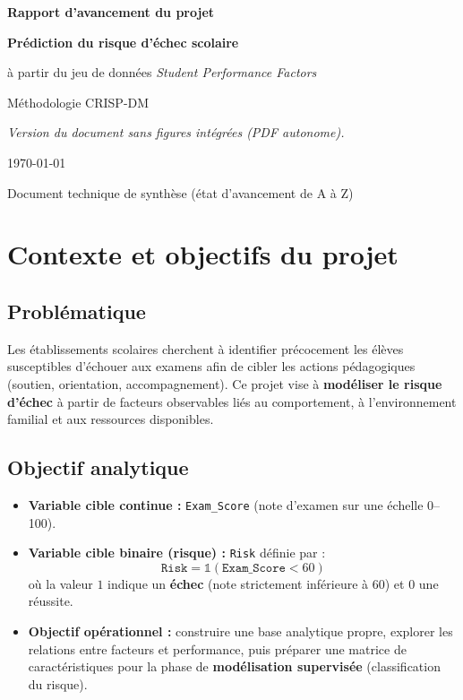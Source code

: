 \documentclass[a4paper,11pt]{article}
\begin{document}
\begin{titlepage}
  \centering
  \vspace*{1.5cm}
  {\LARGE\bfseries Rapport d'avancement du projet\par}
  \vspace{0.8cm}
  {\Huge\bfseries Prédiction du risque d'échec scolaire\par}
  \vspace{0.5cm}
  {\large à partir du jeu de données \textit{Student Performance Factors}\par}
  \vfill
  {\large Méthodologie CRISP-DM\par}
  \vspace{0.5cm}
  {\normalsize\textit{Version du document sans figures intégrées (PDF autonome).}\par}
  \vspace{1cm}
  {\large \today\par}
  \vspace{1.5cm}
  {\normalsize Document technique de synthèse (état d'avancement de A à Z)\par}
\end{titlepage}

\tableofcontents
\newpage

\section{Contexte et objectifs du projet}

\subsection{Problématique}
Les établissements scolaires cherchent à identifier précocement les élèves susceptibles d'échouer aux examens afin de cibler les actions pédagogiques (soutien, orientation, accompagnement). Ce projet vise à \textbf{modéliser le risque d'échec} à partir de facteurs observables liés au comportement, à l'environnement familial et aux ressources disponibles.

\subsection{Objectif analytique}
\begin{itemize}[leftmargin=*]
  \item \textbf{Variable cible continue :} \texttt{Exam\_Score} (note d'examen sur une échelle 0--100).
  \item \textbf{Variable cible binaire (risque) :} \texttt{Risk} définie par :
  \[
    \texttt{Risk} = \mathbb{1}(\texttt{Exam\_Score} < 60)
  \]
  où la valeur $1$ indique un \textbf{échec} (note strictement inférieure à 60) et $0$ une réussite.
  \item \textbf{Objectif opérationnel :} construire une base analytique propre, explorer les relations entre facteurs et performance, puis préparer une matrice de caractéristiques pour la phase de \textbf{modélisation supervisée} (classification du risque).
\end{itemize}
\end{document}
